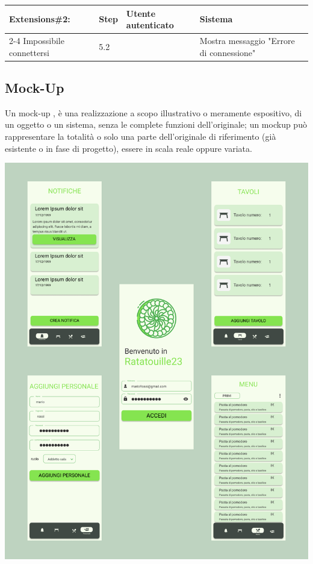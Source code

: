 \begin{table}[H]
\begin{tabularx}{\linewidth}{|l|X|X|X|}
    \hline \multirow{2}{*}{Extensions\#2: } & Step                                                                                                                 & Utente autenticato     & Sistema                                  \\
    \cline{2-4} Impossibile connettersi     & 5.2                                                                                                                  &                        & Mostra messaggio "Errore di connessione" \\
    \hline
  \end{tabularx}
\end{table}

\newpage
\subsection{Mock-Up}
Un mock-up , è una realizzazione a scopo illustrativo o meramente espositivo, di un oggetto o un sistema, senza le complete funzioni
dell'originale; un mockup può rappresentare la totalità o solo una parte dell'originale di riferimento (già esistente o in fase di progetto), essere in scala
reale oppure variata.
\begin{center}
  \includegraphics[scale=0.2]{img/Mock-up.doc}
\end{center}
